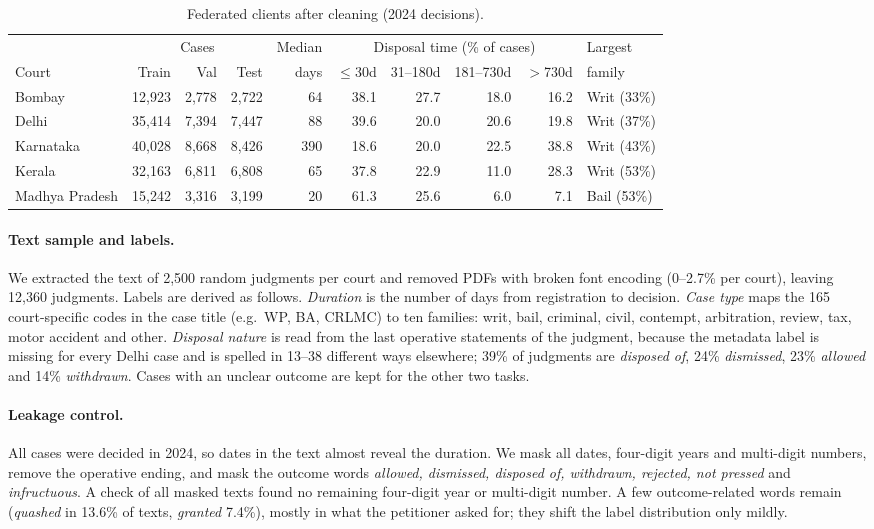 \documentclass[11pt,a4paper]{article}
\begin{document}
\begin{table}[H]\centering\small
\begin{tabular}{@{}lrrrrrrrrl@{}}\toprule
 & \multicolumn{3}{c}{Cases} & Median & \multicolumn{4}{c}{Disposal time (\% of cases)} & Largest \\
\cmidrule(lr){2-4}\cmidrule(lr){6-9}
Court & Train & Val & Test & days & $\le$30d & 31--180d & 181--730d & $>$730d & family \\ \midrule
Bombay & 12,923 & 2,778 & 2,722 & 64 & 38.1 & 27.7 & 18.0 & 16.2 & Writ (33\%) \\
Delhi & 35,414 & 7,394 & 7,447 & 88 & 39.6 & 20.0 & 20.6 & 19.8 & Writ (37\%) \\
Karnataka & 40,028 & 8,668 & 8,426 & 390 & 18.6 & 20.0 & 22.5 & 38.8 & Writ (43\%) \\
Kerala & 32,163 & 6,811 & 6,808 & 65 & 37.8 & 22.9 & 11.0 & 28.3 & Writ (53\%) \\
Madhya Pradesh & 15,242 & 3,316 & 3,199 & 20 & 61.3 & 25.6 & 6.0 & 7.1 & Bail (53\%) \\ \bottomrule
\end{tabular}
\caption{Federated clients after cleaning (2024 decisions).}
\label{tab:clients}
\end{table}

\paragraph{Text sample and labels.} We extracted the text of 2,500 random judgments per court and
removed PDFs with broken font encoding (0--2.7\% per court), leaving 12,360 judgments. Labels are
derived as follows. \emph{Duration} is the number of days from registration to decision. \emph{Case
type} maps the 165 court-specific codes in the case title (e.g.\ WP, BA, CRLMC) to ten families: writ,
bail, criminal, civil, contempt, arbitration, review, tax, motor accident and other. \emph{Disposal
nature} is read from the last operative statements of the judgment, because the metadata label is
missing for every Delhi case and is spelled in 13--38 different ways elsewhere; 39\% of judgments are
\emph{disposed of}, 24\% \emph{dismissed}, 23\% \emph{allowed} and 14\% \emph{withdrawn}. Cases with
an unclear outcome are kept for the other two tasks.

\paragraph{Leakage control.} All cases were decided in 2024, so dates in the text almost reveal the
duration. We mask all dates, four-digit years and multi-digit numbers, remove the operative ending,
and mask the outcome words \emph{allowed, dismissed, disposed of, withdrawn, rejected, not pressed}
and \emph{infructuous}. A check of all masked texts found no remaining four-digit year or multi-digit
number. A few outcome-related words remain (\emph{quashed} in 13.6\% of texts, \emph{granted} 7.4\%),
mostly in what the petitioner asked for; they shift the label distribution only mildly.
\end{document}
